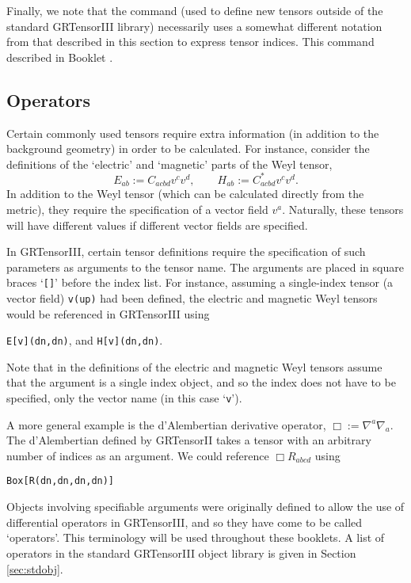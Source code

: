 \documentclass{article}
\begin{document}
Finally, we note that the  command (used to define new tensors
outside of the standard GRTensorIII library) necessarily uses a somewhat
different notation from that described in this section to express tensor
indices. This command described in Booklet \grDefRef.
%
\subsection{Operators} \label{sec:operators}
%
Certain commonly used tensors require extra information (in addition
to the background geometry) in order to be calculated. For instance,
consider the definitions of the `electric' and `magnetic' parts of the
Weyl tensor,
\[
  E_{ab} := C_{acbd} v^c v^d, \qquad H_{ab} := C^*_{acbd} v^c v^d.
\]
In addition to the Weyl tensor (which can be calculated directly from
the metric), they require the specification of a vector field $v^a$.
Naturally, these tensors will have different values if different
vector fields are specified.

In GRTensorIII, certain tensor definitions require the specification of
such parameters as arguments to the tensor name. The arguments are
placed in square braces `\texttt{[]}' before the index list.
For instance, assuming a single-index tensor (a vector field)
\texttt{v(up)} had been defined, the electric and magnetic Weyl tensors
would be referenced in GRTensorIII using
\begin{center}
  \texttt{E[v](dn,dn)}, \quad and \quad \texttt{H[v](dn,dn)}.
\end{center}
Note that in the definitions of the electric and magnetic Weyl
tensors assume that the argument is a single index object, and
so the index does not have to be specified, only the vector name
(in this case `\texttt{v}').

A more general example is the d'Alembertian derivative operator,
$\Box := \nabla^a \nabla_a$. The d'Alembertian defined by GRTensorII
takes a tensor with an arbitrary number of indices as an argument.
We could reference $\Box R_{abcd}$ using
\begin{center}
  \texttt{Box[R(dn,dn,dn,dn)]}
\end{center}

Objects involving specifiable arguments were originally defined to allow
the use of differential operators in GRTensorIII, and so they have come
to be called `operators'. This terminology will be used throughout these
booklets. A list of operators in the standard GRTensorIII object library
is given in Section \ref{sec:stdobj}.
%
\end{document}
